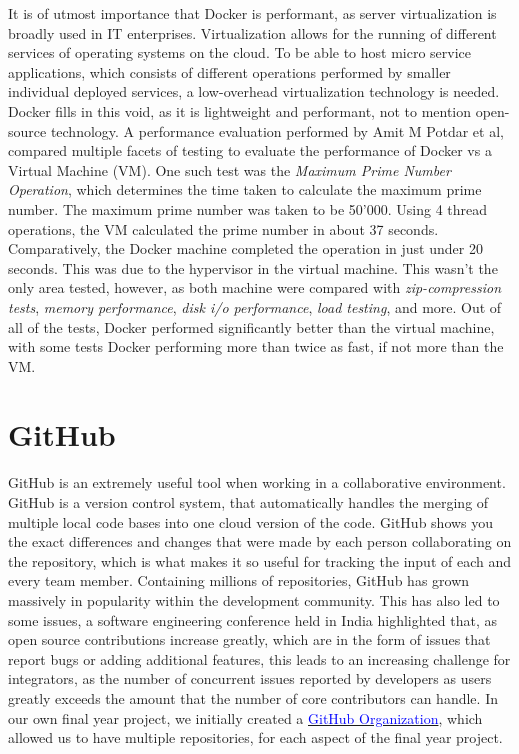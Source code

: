 It is of utmost importance that Docker is performant, as server virtualization is broadly used in IT enterprises. Virtualization allows for the running of different services of operating systems on the cloud. To be able to host micro service applications, which consists of different operations performed by smaller individual deployed services, a low-overhead virtualization technology is needed. Docker fills in this void, as it is lightweight and performant, not to mention open-source technology. A performance evaluation performed by Amit M Potdar et al, compared multiple facets of testing to evaluate the performance of Docker vs a Virtual Machine (VM). One such test was the \textit{Maximum Prime Number Operation}, which determines the time taken to calculate the maximum prime number. The maximum prime number was taken to be 50'000. Using 4 thread operations, the VM calculated the prime number in about 37 seconds. Comparatively, the Docker machine completed the operation in just under 20 seconds. This was due to the hypervisor in the virtual machine. This wasn't the only area tested, however, as both machine were compared with \textit{zip-compression tests}, \textit{memory performance}, \textit{disk i/o performance}, \textit{load testing}, and more. Out of all of the tests, Docker performed significantly better than the virtual machine, with some tests Docker performing more than twice as fast, if not more than the VM\cite{POTDAR20201419}.

\section{GitHub}

GitHub is an extremely useful tool when working in a collaborative environment. GitHub is a version control system, that automatically handles the merging of multiple local code bases into one cloud version of the code. GitHub shows you the exact differences and changes that were made by each person collaborating on the repository, which is what makes it so useful for tracking the input of each and every team member. Containing millions of repositories, GitHub has grown massively in popularity within the development community. This has also led to some issues, a software engineering conference held in India highlighted that, as open source contributions increase greatly, which are in the form of issues that report bugs or adding additional features, this leads to an increasing challenge for integrators, as the number of concurrent issues reported by developers as users greatly exceeds the amount that the number of core contributors can handle\cite{github_issues}. In our own final year project, we initially created a \href{https://docs.github.com/en/organizations/collaborating-with-groups-in-organizations/about-organizations}{\textcolor{blue}{GitHub Organization}}, which allowed us to have multiple repositories, for each aspect of the final year project.

